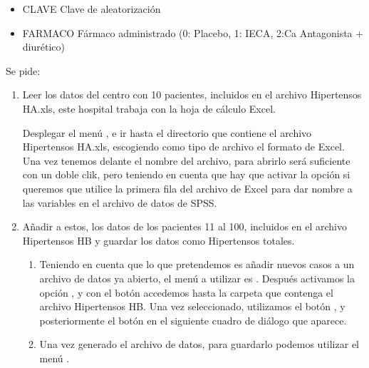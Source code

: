 \documentclass[a4paper]{article}
\begin{document}
\begin{itemize}
    \item CLAVE Clave de aleatorización
    \item FARMACO Fármaco administrado (0: Placebo, 1: IECA,  2:Ca Antagonista + diurético)
\end{itemize}

Se pide:

\begin{enumerate}
\item Leer los datos del centro con 10 pacientes, incluidos en el
archivo \textsf{Hipertensos HA.xls}, este hospital trabaja con la
hoja de cálculo Excel.

\begin{indicacion}{
Desplegar el menú , e ir hasta el
directorio que contiene el archivo \textsf{Hipertensos HA.xls},
escogiendo como tipo de archivo el formato de Excel. Una vez tenemos
delante el nombre del archivo, para abrirlo será suficiente con un
doble clik, pero teniendo en cuenta que hay que activar la opción
 si queremos que utilice la primera
fila del archivo de Excel para dar nombre a las variables en el
archivo de datos de SPSS.}
\end{indicacion}

\item Añadir a estos, los datos de los pacientes 11 al 100,
incluidos en el archivo \textsf{Hipertensos HB} y guardar los datos
como \textsf{Hipertensos totales}.


\begin{indicacion}{
\begin{enumerate}
\item Teniendo en cuenta que lo que pretendemos es añadir nuevos casos
a un archivo de datos ya abierto, el menú a utilizar es
. Después activamos la
opción , y con el botón
 accedemos hasta la carpeta que contenga el archivo
\textsf{Hipertensos HB}. Una vez seleccionado, utilizamos el botón
, y posteriormente el botón  en el
siguiente cuadro de diálogo que aparece.
\item Una vez generado el archivo de datos, para guardarlo podemos
utilizar el menú .
\end{enumerate}
}
\end{indicacion}


\end{enumerate}
\end{document}
